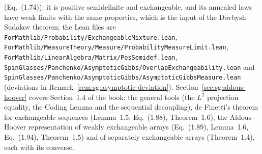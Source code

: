 (Eq.~(1.74)): it is positive semidefinite and exchangeable, and its annealed laws have weak limits with the same properties, which is the input of
the Dovbysh--Sudakov theorem; the Lean files are \texttt{ForMathlib/Probability/ExchangeableMixture.lean},
\texttt{ForMathlib/MeasureTheory/Measure/ProbabilityMeasureLimit.lean}, \texttt{ForMathlib/LinearAlgebra/Matrix/PosSemidef.lean},
\texttt{SpinGlasses/Panchenko/AsymptoticGibbs/OverlapExchangeability.lean} and \texttt{SpinGlasses/Panchenko/AsymptoticGibbs/AsymptoticGibbsMeasure.lean}
(deviations in Remark~\ref{rem:sg:asymptotic-deviation}).
Section~\ref{sec:sg:aldous-hoover} covers Section~1.4 of the book: the general tools
(the $L^2$ projection equality, the Coding Lemma and the sequential decoupling), de Finetti's theorem for exchangeable sequences (Lemma~1.5, Eq.~(1.88), Theorem~1.6), the Aldous--Hoover representation of weakly exchangeable arrays (Eq.~(1.89), Lemma~1.6, Eq.~(1.94), Theorem~1.5) and of separately exchangeable arrays (Theorem~1.4), each with its converse.
